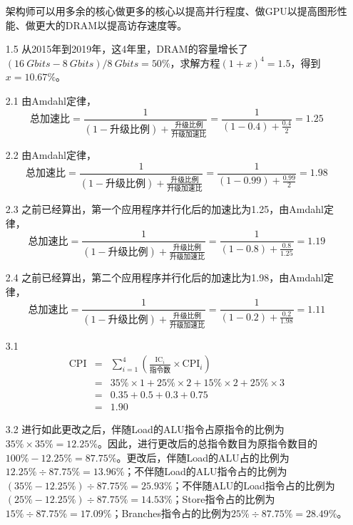 \documentclass[UTF8,zihao=-4]{ctexart}
\begin{document}
\begin{itemize}
		架构师可以用多余的核心做更多的核心以提高并行程度、做GPU以提高图形性能、做更大的DRAM以提高访存速度等。
		\item[1.5] 从2015年到2019年，这4年里，DRAM的容量增长了$(\SI{16}{Gbits}-\SI{8}{Gbits})/\SI{8}{Gbits}=50\%$，求解方程$(1+x)^4=1.5$，得到$x=10.67\%$。
		\item[2.1] 由Amdahl定律，
		\begin{equation*}
			\text{总加速比}=\frac{1}{(1-\text{升级比例})+\frac{\text{升级比例}}{\text{升级加速比}}}=\frac{1}{(1-0.4)+\frac{0.4}{2}}=1.25
		\end{equation*}
		\item[2.2] 由Amdahl定律，
		\begin{equation*}
			\text{总加速比}=\frac{1}{(1-\text{升级比例})+\frac{\text{升级比例}}{\text{升级加速比}}}=\frac{1}{(1-0.99)+\frac{0.99}{2}}=1.98
		\end{equation*}
		\item[2.3] 之前已经算出，第一个应用程序并行化后的加速比为1.25，由Amdahl定律， 
		\begin{equation*}
			\text{总加速比}=\frac{1}{(1-\text{升级比例})+\frac{\text{升级比例}}{\text{升级加速比}}}=\frac{1}{(1-0.8)+\frac{0.8}{1.25}}=1.19
		\end{equation*}
		\item[2.4] 之前已经算出，第二个应用程序并行化后的加速比为1.98，由Amdahl定律， 
		\begin{equation*}
			\text{总加速比}=\frac{1}{(1-\text{升级比例})+\frac{\text{升级比例}}{\text{升级加速比}}}=\frac{1}{(1-0.2)+\frac{0.2}{1.98}}=1.11
		\end{equation*}
		\item[3.1]
		\begin{eqnarray*}
			\text{CPI} &= &\sum_{i=1}^4\left (\frac{\text{IC}_i}{\text{指令数}}\times \text{CPI}_i \right ) \\
			&= &35\% \times 1 + 25\% \times 2 + 15\% \times 2 + 25\% \times 3 \\
			&= &0.35 + 0.5 + 0.3 + 0.75 \\
			&= &1.90
		\end{eqnarray*} 
		\item[3.2]
		进行如此更改之后，伴随Load的ALU指令占原指令的比例为$35\%\times 35\% = 12.25\%$。因此，进行更改后的总指令数目为原指令数目的$100\%-12.25\%=87.75\%$。更改后，伴随Load的ALU占的比例为$12.25\% \div 87.75\% = 13.96\%$；不伴随Load的ALU指令占的比例为$(35\%-12.25\%) \div 87.75\% = 25.93\%$；不伴随ALU的Load指令占的比例为$(25\%-12.25\%)\div87.75\%=14.53\%$；Store指令占的比例为$15\%\div87.75\%=17.09\%$；Branches指令占的比例为$25\%\div 87.75\%=28.49\%$。

\end{itemize}
\end{document}
